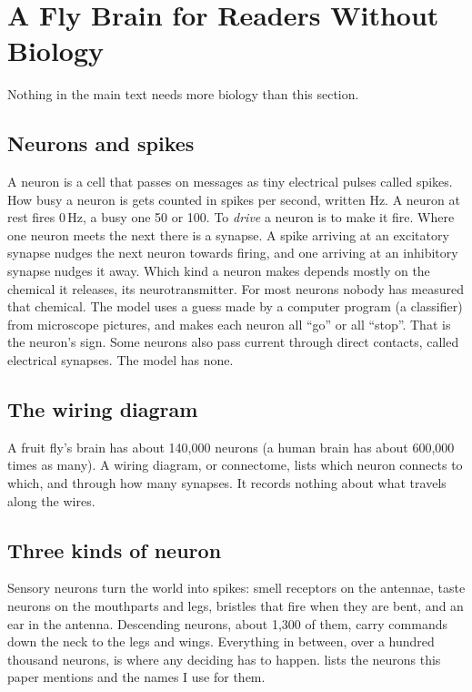 \documentclass[11pt,a4paper]{article}
\begin{document}
\section{A Fly Brain for Readers Without Biology}
\label{sec:guide}

Nothing in the main text needs more biology than this section.

\subsection*{Neurons and spikes}

A neuron is a cell that passes on messages as tiny electrical pulses called spikes. How busy a neuron is gets counted in spikes per second, written Hz. A neuron at rest fires 0\,Hz, a busy one 50 or 100. To \emph{drive} a neuron is to make it fire. Where one neuron meets the next there is a synapse. A spike arriving at an excitatory synapse nudges the next neuron towards firing, and one arriving at an inhibitory synapse nudges it away. Which kind a neuron makes depends mostly on the chemical it releases, its neurotransmitter. For most neurons nobody has measured that chemical. The model uses a guess made by a computer program (a classifier) from microscope pictures, and makes each neuron all ``go'' or all ``stop''. That is the neuron's sign. Some neurons also pass current through direct contacts, called electrical synapses. The model has none.

\subsection*{The wiring diagram}

A fruit fly's brain has about 140{,}000 neurons (a human brain has about 600{,}000 times as many). A wiring diagram, or connectome, lists which neuron connects to which, and through how many synapses. It records nothing about what travels along the wires.

\subsection*{Three kinds of neuron}

Sensory neurons turn the world into spikes: smell receptors on the antennae, taste neurons on the mouthparts and legs, bristles that fire when they are bent, and an ear in the antenna. Descending neurons, about 1{,}300 of them, carry commands down the neck to the legs and wings. Everything in between, over a hundred thousand neurons, is where any deciding has to happen.  lists the neurons this paper mentions and the names I use for them.
\end{document}
